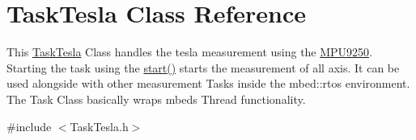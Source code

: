 \hypertarget{class_task_tesla}{}\section{Task\+Tesla Class Reference}
\label{class_task_tesla}


This \hyperlink{class_task_tesla}{Task\+Tesla} Class handles the tesla measurement using the \hyperlink{class_m_p_u9250}{M\+P\+U9250}. Starting the task using the \hyperlink{class_task_tesla_a42c4e57484a682500f4c0c3079df494e}{start()} starts the measurement of all axis. It can be used alongside with other measurement Tasks inside the mbed\+::rtos environment. The Task Class basically wraps mbeds Thread functionality.  




{\ttfamily \#include $<$Task\+Tesla.\+h$>$}

